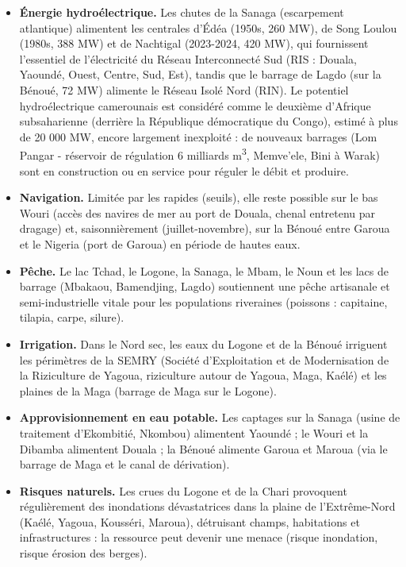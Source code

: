 \documentclass[11pt]{article}
\newcommand{\cle}[1]{{\popxbold\color{popdark}#1}}
\begin{document}
\begin{itemize}
\item \textbf{Énergie hydroélectrique.} Les chutes de la Sanaga (escarpement atlantique) alimentent les centrales d'\cle{Édéa} (1950s, 260 MW), de \cle{Song Loulou} (1980s, 388 MW) et de \cle{Nachtigal} (2023-2024, 420 MW), qui fournissent l'essentiel de l'électricité du Réseau Interconnecté Sud (RIS : Douala, Yaoundé, Ouest, Centre, Sud, Est), tandis que le barrage de \cle{Lagdo} (sur la Bénoué, 72 MW) alimente le Réseau Isolé Nord (RIN). Le potentiel hydroélectrique camerounais est considéré comme le deuxième d'Afrique subsaharienne (derrière la République démocratique du Congo), estimé à plus de 20 000 MW, encore largement inexploité : de nouveaux barrages (Lom Pangar - réservoir de régulation 6 milliards m\textsuperscript{3}, Memve'ele, Bini à Warak) sont en construction ou en service pour réguler le débit et produire.
\item \textbf{Navigation.} Limitée par les rapides (seuils), elle reste possible sur le bas Wouri (accès des navires de mer au port de Douala, chenal entretenu par dragage) et, saisonnièrement (juillet-novembre), sur la Bénoué entre Garoua et le Nigeria (port de Garoua) en période de hautes eaux.
\item \textbf{Pêche.} Le lac Tchad, le Logone, la Sanaga, le Mbam, le Noun et les lacs de barrage (Mbakaou, Bamendjing, Lagdo) soutiennent une pêche artisanale et semi-industrielle vitale pour les populations riveraines (poissons : capitaine, tilapia, carpe, silure).
\item \textbf{Irrigation.} Dans le Nord sec, les eaux du Logone et de la Bénoué irriguent les périmètres de la \cle{SEMRY} (Société d'Exploitation et de Modernisation de la Riziculture de Yagoua, riziculture autour de Yagoua, Maga, Kaélé) et les plaines de la Maga (barrage de Maga sur le Logone).
\item \textbf{Approvisionnement en eau potable.} Les captages sur la Sanaga (usine de traitement d'Ekombitié, Nkombou) alimentent Yaoundé ; le Wouri et la Dibamba alimentent Douala ; la Bénoué alimente Garoua et Maroua (via le barrage de Maga et le canal de dérivation).
\item \textbf{Risques naturels.} Les crues du Logone et de la Chari provoquent régulièrement des inondations dévastatrices dans la plaine de l'Extrême-Nord (Kaélé, Yagoua, Kousséri, Maroua), détruisant champs, habitations et infrastructures : la ressource peut devenir une menace (risque inondation, risque érosion des berges).
\end{itemize}
\end{document}

